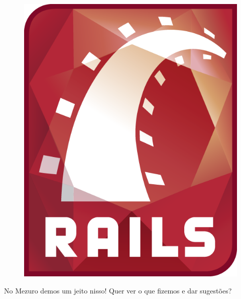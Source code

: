 \documentclass{beamer}
\begin{document}
\begin{frame}
\begin{multicols}{2}
    \begin{figure}[htb]
      \begin{center}
        \includegraphics[scale=0.2]{rails.png}
      \end{center}
    \end{figure}
  \end{multicols}

  No Mezuro demos um jeito nisso! Quer ver o que fizemos e dar sugestões?
\end{frame}
\end{document}

